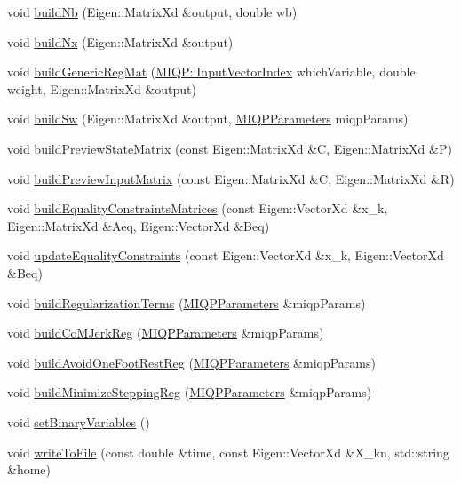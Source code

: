 \begin{DoxyCompactItemize}
void \hyperlink{classMIQPController_a8b83fba21208a3becff314d26ba45679}{build\-Nb} (\-Eigen\-::\-Matrix\-Xd \&output, double wb)
\item 
void \hyperlink{classMIQPController_a959d9957a931315d3f1cf95ad5c07a65}{build\-Nx} (\-Eigen\-::\-Matrix\-Xd \&output)
\item 
void \hyperlink{classMIQPController_ab8b3555a9f64417f2b986784c3ab8bd6}{build\-Generic\-Reg\-Mat} (\hyperlink{namespaceMIQP_a88adf7c800494cf6d751d065e642b45b}{\-M\-I\-Q\-P\-::\-Input\-Vector\-Index} which\-Variable, double weight, \-Eigen\-::\-Matrix\-Xd \&output)
\item 
void \hyperlink{classMIQPController_a3085bba3c89e6ed0265e8e229590e7f1}{build\-Sw} (\-Eigen\-::\-Matrix\-Xd \&output, \hyperlink{structMIQPParameters}{\-M\-I\-Q\-P\-Parameters} miqp\-Params)
\item 
void \hyperlink{classMIQPController_ad9a2e7d2c658937c847097f83d3408e3}{build\-Preview\-State\-Matrix} (const \-Eigen\-::\-Matrix\-Xd \&\-C, \-Eigen\-::\-Matrix\-Xd \&\-P)
\item 
void \hyperlink{classMIQPController_a9e4f007d1b6b7f68582aebbc09cf0813}{build\-Preview\-Input\-Matrix} (const \-Eigen\-::\-Matrix\-Xd \&\-C, \-Eigen\-::\-Matrix\-Xd \&\-R)
\item 
void \hyperlink{classMIQPController_a870c7d3c0e5fcfd46f7bb95924007082}{build\-Equality\-Constraints\-Matrices} (const \-Eigen\-::\-Vector\-Xd \&x\-\_\-k, \-Eigen\-::\-Matrix\-Xd \&\-Aeq, \-Eigen\-::\-Vector\-Xd \&\-Beq)
\item 
void \hyperlink{classMIQPController_a4c3f665528fae6c051160456692372ee}{update\-Equality\-Constraints} (const \-Eigen\-::\-Vector\-Xd \&x\-\_\-k, \-Eigen\-::\-Vector\-Xd \&\-Beq)
\item 
void \hyperlink{classMIQPController_a973c28f80d04db7cdbdced07e1eeda16}{build\-Regularization\-Terms} (\hyperlink{structMIQPParameters}{\-M\-I\-Q\-P\-Parameters} \&miqp\-Params)
\item 
void \hyperlink{classMIQPController_ac458316007d11e4b592cfb2e227bad69}{build\-Co\-M\-Jerk\-Reg} (\hyperlink{structMIQPParameters}{\-M\-I\-Q\-P\-Parameters} \&miqp\-Params)
\item 
void \hyperlink{classMIQPController_ad18d82e49c5508dc0239c21a85809131}{build\-Avoid\-One\-Foot\-Rest\-Reg} (\hyperlink{structMIQPParameters}{\-M\-I\-Q\-P\-Parameters} \&miqp\-Params)
\item 
void \hyperlink{classMIQPController_af721e438de3208adc893abe78551a0cb}{build\-Minimize\-Stepping\-Reg} (\hyperlink{structMIQPParameters}{\-M\-I\-Q\-P\-Parameters} \&miqp\-Params)
\item 
void \hyperlink{classMIQPController_afce6feca593352323e052b6c993cbf69}{set\-Binary\-Variables} ()
\item 
void \hyperlink{classMIQPController_a014cab392ddec6085df74f2590af4791}{write\-To\-File} (const double \&time, const \-Eigen\-::\-Vector\-Xd \&\-X\-\_\-kn, std\-::string \&home)
\end{DoxyCompactItemize}
